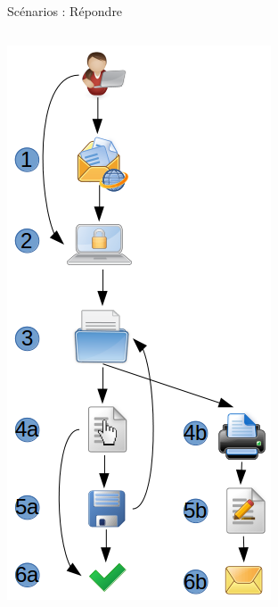 \documentclass[11pt]{beamer}
\begin{document}
\begin{frame}{Scénarios : Répondre}
\begin{columns}[t]
	\begin{column}[T]{.5\textwidth}
		\begin{center}
		\includegraphics[width=.23\paperwidth]{images/scenario_fill.png}
		\end{center}
  	\end{column}
  	\begin{column}[T]{.5\textwidth}
  		\begin{center}

\end{center}
\end{column}
\end{columns}
\end{frame}
\end{document}
